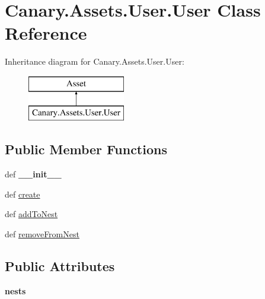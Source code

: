 \hypertarget{class_canary_8_assets_1_1_user_1_1_user}{\section{Canary.\-Assets.\-User.\-User Class Reference}
\label{class_canary_8_assets_1_1_user_1_1_user}
}
Inheritance diagram for Canary.\-Assets.\-User.\-User\-:\begin{figure}[H]
\begin{center}
\leavevmode
\includegraphics[height=2.000000cm]{class_canary_8_assets_1_1_user_1_1_user}
\end{center}
\end{figure}
\subsection*{Public Member Functions}
\begin{DoxyCompactItemize}
\item 
\hypertarget{class_canary_8_assets_1_1_user_1_1_user_ae9ad4fa8a8580dba03830aecef3984d5}{def {\bfseries \-\_\-\-\_\-init\-\_\-\-\_\-}}\label{class_canary_8_assets_1_1_user_1_1_user_ae9ad4fa8a8580dba03830aecef3984d5}

\item 
def \hyperlink{class_canary_8_assets_1_1_user_1_1_user_ab3cb3b81e338ac771a0a214a552f1cfb}{create}
\item 
def \hyperlink{class_canary_8_assets_1_1_user_1_1_user_a58489d63ddb45def60aae056b2b4c7b7}{add\-To\-Nest}
\item 
def \hyperlink{class_canary_8_assets_1_1_user_1_1_user_a4f6d3534c5ff7711c8a898864180d824}{remove\-From\-Nest}
\end{DoxyCompactItemize}
\subsection*{Public Attributes}
\begin{DoxyCompactItemize}
\item 
\hypertarget{class_canary_8_assets_1_1_user_1_1_user_a9f9181124f34792d7b368968660e60cf}{{\bfseries nests}}\label{class_canary_8_assets_1_1_user_1_1_user_a9f9181124f34792d7b368968660e60cf}

\end{DoxyCompactItemize}


